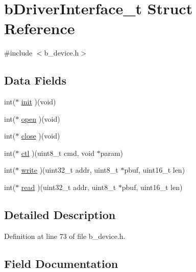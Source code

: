\hypertarget{structb_driver_interface__t}{}\section{b\+Driver\+Interface\+\_\+t Struct Reference}
\label{structb_driver_interface__t}


{\ttfamily \#include $<$b\+\_\+device.\+h$>$}

\subsection*{Data Fields}
\begin{DoxyCompactItemize}
\item 
int($\ast$ \mbox{\hyperlink{structb_driver_interface__t_a857eaefcde68aba9fe0d2170a660fdfb}{init}} )(void)
\item 
int($\ast$ \mbox{\hyperlink{structb_driver_interface__t_a87e704566d0a15f1aabbbfb208438c81}{open}} )(void)
\item 
int($\ast$ \mbox{\hyperlink{structb_driver_interface__t_a533fda1241149e9fe787957492b2b1fc}{close}} )(void)
\item 
int($\ast$ \mbox{\hyperlink{structb_driver_interface__t_a92bf484ff16ad77727b6afe688c7e98e}{ctl}} )(uint8\+\_\+t cmd, void $\ast$param)
\item 
int($\ast$ \mbox{\hyperlink{structb_driver_interface__t_af67fbf8f75e899efac0872e7469a33c2}{write}} )(uint32\+\_\+t addr, uint8\+\_\+t $\ast$pbuf, uint16\+\_\+t len)
\item 
int($\ast$ \mbox{\hyperlink{structb_driver_interface__t_a671c1e21440d7a8a58f1e244a4880d6f}{read}} )(uint32\+\_\+t addr, uint8\+\_\+t $\ast$pbuf, uint16\+\_\+t len)
\end{DoxyCompactItemize}


\subsection{Detailed Description}


Definition at line 73 of file b\+\_\+device.\+h.



\subsection{Field Documentation}
\mbox{\label{structb_driver_interface__t_a533fda1241149e9fe787957492b2b1fc}} 
